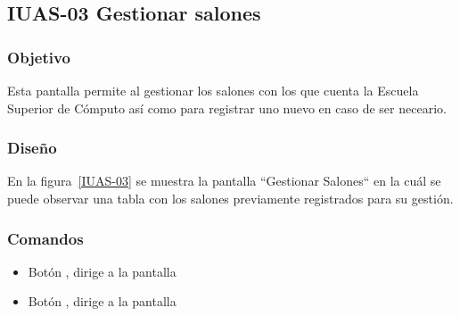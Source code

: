 \subsection{IUAS-03 Gestionar salones}

\subsubsection{Objetivo}

	
    Esta pantalla permite al  gestionar los salones con los que cuenta la Escuela Superior de Cómputo así como para registrar uno nuevo en caso de ser neceario.
    
\subsubsection{Diseño}


    En la figura~\ref{IUAS-03} se muestra la pantalla ``Gestionar Salones“ en la cuál se puede observar una tabla con los salones previamente registrados para su gestión.
    



\subsubsection{Comandos}
    \begin{itemize}

	\item Botón , dirige a la pantalla  
	\item Botón , dirige a la pantalla  
    \end{itemize}
